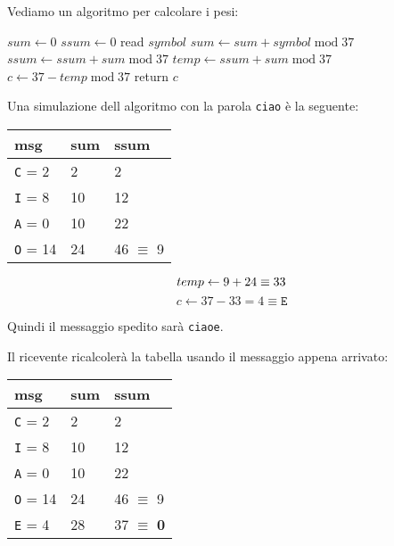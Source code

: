 Vediamo un algoritmo per calcolare i pesi:

\begin{algorithm}
	\begin{algorithmic}[1]
		\State $\textit{sum} \gets 0$
		\State $\textit{ssum} \gets 0$
		\State read $\textit{symbol}$
		\State $sum \gets sum + \textit{symbol} \; \text{mod} \; 37$
		\State $ssum \gets ssum + \textit{sum} \; \text{mod} \; 37$
		\EndWhile
		\State $temp \gets ssum + sum \; \text{mod} \; 37$
		\State $c \gets 37 - temp \; \text{mod} \; 37$
		\State return $c$
		\EndProcedure
	\end{algorithmic}
\end{algorithm}

Una simulazione dell algoritmo con la parola \texttt{ciao} è la seguente:

\begin{table}[h]
	\centering
	\begin{tabular}{l|l|l}
		msg & sum & ssum   \\
		\hline
		\texttt{C} = 2  & 2   & 2      \\
		\texttt{I} = 8  & 10  & 12     \\
		\texttt{A} = 0  & 10  & 22     \\
		\texttt{O} = 14 & 24  & 46 $\equiv$ 9
	\end{tabular}
\end{table}
\vspace{-5mm}
\begin{equation*}
temp \leftarrow 9 + 24 \equiv 33\\
\end{equation*}
\begin{equation*}
c \gets 37 - 33 = 4 \equiv \texttt{E}
\end{equation*}

\medskip

Quindi il messaggio spedito sarà \texttt{ciaoe}.

\newpage

Il ricevente ricalcolerà la tabella usando il messaggio appena arrivato:

\begin{table}[H]
	\centering
	\begin{tabular}{l|l|l}
		msg & sum & ssum   \\
		\hline
		\texttt{C} = 2   & 2   & 2      \\
		\texttt{I} = 8   & 10  & 12     \\
		\texttt{A} = 0   & 10  & 22     \\
		\texttt{O} = 14   & 24  & 46 $\equiv$ 9 \\
		\texttt{E} = 4  & 28  & 37 $\equiv$ \textbf{0}
	\end{tabular}
\end{table}

